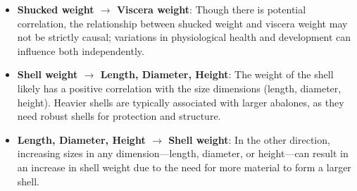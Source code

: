 \documentclass{article}
\begin{document}
\begin{minipage}[t]{0.7\linewidth}
\begin{itemize}
    \item \textbf{Shucked weight $\rightarrow$ Viscera weight}: Though there is potential correlation, the relationship between shucked weight and viscera weight may not be strictly causal; variations in physiological health and development can influence both independently.

    \item \textbf{Shell weight $\rightarrow$ Length, Diameter, Height}: The weight of the shell likely has a positive correlation with the size dimensions (length, diameter, height). Heavier shells are typically associated with larger abalones, as they need robust shells for protection and structure.

    \item \textbf{Length, Diameter, Height $\rightarrow$ Shell weight}: In the other direction, increasing sizes in any dimension—length, diameter, or height—can result in an increase in shell weight due to the need for more material to form a larger shell.
\end{itemize}
\vfill
\end{minipage}
\hspace{0.05\textwidth}
\end{document}
